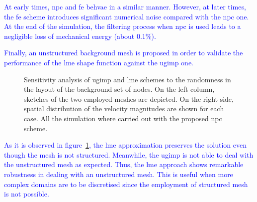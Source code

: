 \documentclass[preprint,12pt,a4paper]{elsarticle}
\begin{document}
\textcolor{blue}{At early times, \acrshort{npc} and \acrshort{fe} behvae in a similar manner. However, at later times, the \acrshort{fe} scheme introduces significant numerical noise compared with the \acrshort{npc} one. At the end of the simulation, the filtering process when \acrshort{npc} is used leads to a negligible loss of mechanical energy (about 0.1\%).} 

\textcolor{blue}{Finally, an unstructured background mesh is proposed in order to validate the performance of the \acrshort{lme} shape function against the \acrshort{ugimp} one.}
\begin{figure}
  \centering
  \caption{Sensitivity analysis of \acrshort{ugimp} and \acrshort{lme} schemes to the randomness in the layout of the background set of nodes. On the left column, sketches of the two employed meshes are depicted. On the right side, spatial distribution of the velocity magnitudes are shown for each case. All the simulation where carried out with the proposed \acrshort{npc} scheme.}
  \label{fig:Magnitude_velocity_impact_square_structured_unestructured}
\end{figure}
\textcolor{blue}{ As it is observed in figure~\ref{fig:Magnitude_velocity_impact_square_structured_unestructured}, the \acrshort{lme} approximation preserves the solution even though the mesh is not structured. Meanwhile, the \acrshort{ugimp} is not able to deal with the unstructured mesh as expected. %
Thus, the \acrshort{lme} approach shows remarkable robustness in dealing with an unstructured mesh. This is useful when more complex domains are to be discretised since the employment of  structured mesh is not possible.}
\end{document}

